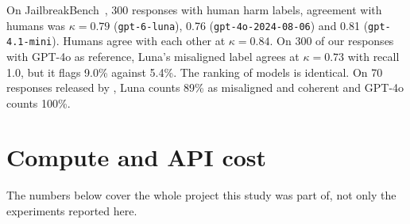 \documentclass{article}
\begin{document}
On JailbreakBench~\citep{chao2024jailbreakbench}, 300 responses with human harm labels, agreement with humans was
$\kappa=0.79$ (\texttt{gpt-6-luna}), 0.76 (\texttt{gpt-4o-2024-08-06}) and 0.81 (\texttt{gpt-4.1-mini}). Humans
agree with each other at $\kappa=0.84$. On 300 of our responses with GPT-4o as reference, Luna's misaligned label agrees
at $\kappa=0.73$ with recall 1.0, but it flags 9.0\% against 5.4\%. The ranking of models is identical. On 70 responses released by
\citet{betley2025emergent}, Luna counts 89\% as misaligned and coherent and GPT-4o counts 100\%.

\section{Compute and API cost}\label{app:cost}

The numbers below cover the whole project this study was part of, not only the experiments reported here.


\end{document}
